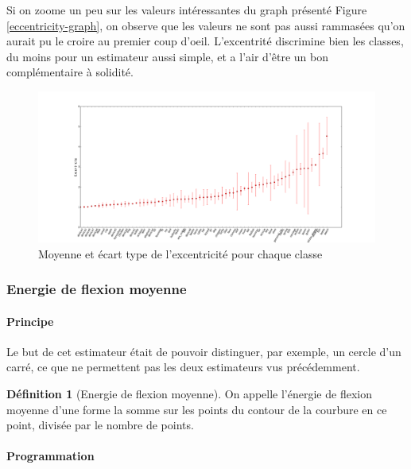 \documentclass{article}
\theoremstyle{definition}
\newtheorem{definition}{Définition}
\begin{document}
	  Si on zoome un peu sur les valeurs intéressantes du graph présenté Figure \ref{eccentricity-graph}, on observe que les valeurs ne sont pas aussi rammasées qu'on aurait pu le croire au premier coup d'oeil. L'excentrité discrimine bien les classes, du moins pour un estimateur aussi simple, et a l'air d'être un bon complémentaire à solidité.
	  
	  \begin{figure}[!h]
	    \begin{bigcenter}
	      \includegraphics[scale=0.38]{Graphes/eccentricitybis.png}
	    \end{bigcenter}
	    \caption{Moyenne et écart type de l'excentricité pour chaque classe}
	    \label{eccentricity-graph-2}
	  \end{figure}
      
      \subsubsection{Energie de flexion moyenne}
      
	\paragraph{Principe}
	
	  Le but de cet estimateur était de pouvoir distinguer, par exemple, un cercle d'un carré, ce que ne permettent pas les deux estimateurs vus précédemment.
	  
	  \begin{definition}[Energie de flexion moyenne]
	    On appelle l'énergie de flexion moyenne d'une forme la somme sur les points du contour de la courbure en ce point, divisée par le nombre de points.
	  \end{definition}
	
	\paragraph{Programmation}
	
\end{document}
